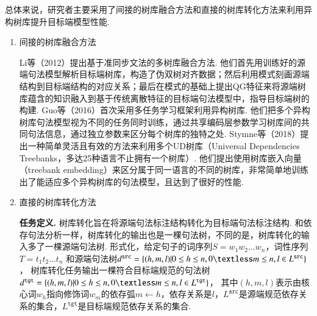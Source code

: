 总体来说，研究者主要采用了间接的树库融合方法和直接的树库转化方法来利用异构树库提升目标端模型性能.
\begin{enumerate}
    \item 间接的树库融合方法
          
          Li等（2012）提出基于准同步文法的多树库融合方法. 他们首先用训练好的源端句法模型解析目标端树库，构造了伪双树对齐数据；然后利用模式刻画源端结构到目标端结构的对应关系；最后在模式的基础上提出QG特征来将源端树库蕴含的知识融入到基于传统离散特征的目标端句法模型中，指导目标端树的构建. Guo等（2016）首次采用多任务学习框架利用异构树库. 他们把多个异构树库句法模型视为不同的任务同时训练，通过共享编码层参数学习树库间的共同句法信息，通过独立参数来区分每个树库的独特之处. Stymne等（2018）提出一种简单灵活且有效的方法来利用多个UD树库（Universal Dependencies Treebanks，多达25种语言不止拥有一个树库）. 他们提出使用树库嵌入向量（treebank embedding）来区分属于同一语言的不同的树库，非常简单地训练出了能适应多个异构树库的句法模型，且达到了很好的性能.
          
          
          
    \item 直接的树库转化方法
          
          \textbf{任务定义.  }树库转化旨在将源端句法标注结构转化为目标端句法标注结构. 和依存句法分析一样，树库转化的输出也是一棵句法树，不同的是，树库转化的输入多了一棵源端句法树. 形式化，给定句子的词序列$S=w_1w_2\dots w_n$，词性序列$T=t_1t_2\dots t_n$
          和源端句法树$d^{\texttt{src}}=\{(h,m,l) | 0 \leq h \leq n, 0 \textless m \leq n, l \in L^{\texttt{src}}\}$，
          树库转化任务输出一棵符合目标端规范的句法树$d^{\texttt{tgt}}=\{(h,m,l)|0 \leq h \leq n, 0 \textless m \leq n, l \in L^{\texttt{tgt}} \}$，
          其中$(h,m,l)$表示由核心词$w_h$指向修饰词$w_m$的依存弧$ m \leftarrow h$，依存关系是$l$，$L^{\texttt{src}}$是源端规范依存关系的集合，$L^{\texttt{tgt}}$是目标端规范依存关系的集合.
          

\end{enumerate}

